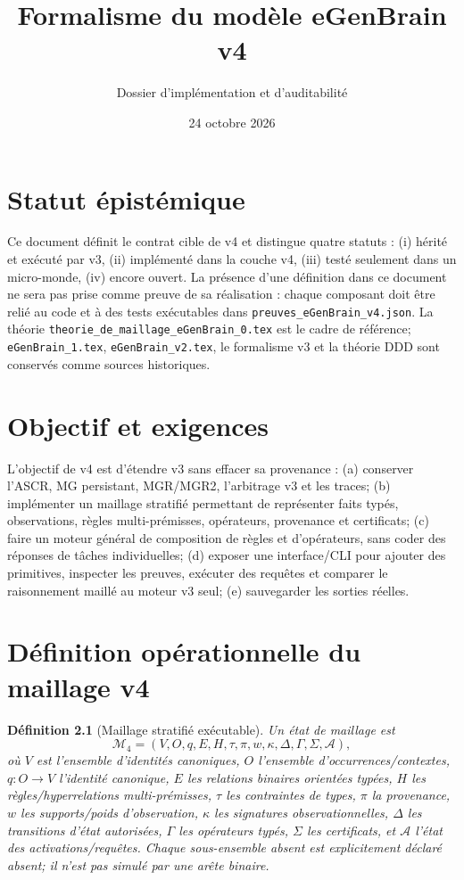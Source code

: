 \documentclass[11pt,a4paper]{book}
\title{Formalisme du modèle eGenBrain v4}
\author{Dossier d'implémentation et d'auditabilité}
\date{24 octobre 2026}
\newtheorem{definition}{Définition}[chapter]
\begin{document}
\maketitle
\chapter*{Statut épistémique}
Ce document définit le contrat cible de v4 et distingue quatre statuts : (i) hérité et exécuté par v3, (ii) implémenté dans la couche v4, (iii) testé seulement dans un micro-monde, (iv) encore ouvert. La présence d'une définition dans ce document ne sera pas prise comme preuve de sa réalisation : chaque composant doit être relié au code et à des tests exécutables dans \texttt{preuves\_eGenBrain\_v4.json}. La théorie \texttt{theorie\_de\_maillage\_eGenBrain\_0.tex} est le cadre de référence; \texttt{eGenBrain\_1.tex}, \texttt{eGenBrain\_v2.tex}, le formalisme v3 et la théorie DDD sont conservés comme sources historiques.

\chapter{Objectif et exigences}
L'objectif de v4 est d'étendre v3 sans effacer sa provenance : (a) conserver l'ASCR, MG persistant, MGR/MGR2, l'arbitrage v3 et les traces; (b) implémenter un maillage stratifié permettant de représenter faits typés, observations, règles multi-prémisses, opérateurs, provenance et certificats; (c) faire un moteur général de composition de règles et d'opérateurs, sans coder des réponses de tâches individuelles; (d) exposer une interface/CLI pour ajouter des primitives, inspecter les preuves, exécuter des requêtes et comparer le raisonnement maillé au moteur v3 seul; (e) sauvegarder les sorties réelles.

\chapter{Définition opérationnelle du maillage v4}
\begin{definition}[Maillage stratifié exécutable]
Un état de maillage est
\[
\mathcal M_4=(V,O,q,E,H,\tau,\pi,w,\kappa,\Delta,\Gamma,\Sigma,\mathcal A),
\]
où $V$ est l'ensemble d'identités canoniques, $O$ l'ensemble d'occurrences/contextes, $q:O\to V$ l'identité canonique, $E$ les relations binaires orientées typées, $H$ les règles/hyperrelations multi-prémisses, $\tau$ les contraintes de types, $\pi$ la provenance, $w$ les supports/poids d'observation, $\kappa$ les signatures observationnelles, $\Delta$ les transitions d'état autorisées, $\Gamma$ les opérateurs typés, $\Sigma$ les certificats, et $\mathcal A$ l'état des activations/requêtes. Chaque sous-ensemble absent est explicitement déclaré absent; il n'est pas simulé par une arête binaire.
\end{definition}
\end{document}
